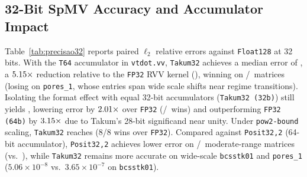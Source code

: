 \documentclass[conference]{IEEEtran}
\begin{document}
\subsection{32-Bit SpMV Accuracy and Accumulator Impact}
Table~\ref{tab:precisao32} reports paired $\ell_2$ relative errors against \texttt{Float128} at 32 bits. With the \texttt{T64} accumulator in \texttt{vtdot.vv}, \texttt{Takum32} achieves a median error of \MedTakumTrinta, a $5.15\times$ reduction relative to the \texttt{FP32} RVV kernel (\MedFPtrinta), winning on \ParTrintaFPTakumVence/\ParTrintaFPAmbos\ matrices (losing on \texttt{pores\_1}, whose entries span wide scale shifts near regime transitions). Isolating the format effect with equal 32-bit accumulators (\texttt{Takum32 (32b)}) still yields \MedTakumTrintaAcTrinta, lowering error by $2.01\times$ over \texttt{FP32} (\ParTrintaAcFPTakumVence/\ParTrintaAcFPAmbos\ wins) and outperforming \texttt{FP32 (64b)} by $3.15\times$ due to Takum's 28-bit significand near unity. Under \texttt{pow2-bound} scaling, \texttt{Takum32} reaches \MedTakumTrintaScaled (8/8 wins over \texttt{FP32}). Compared against \texttt{Posit32,2} (64-bit accumulator), \texttt{Posit32,2} achieves lower error on \ParTrintaPositOutroVence/\ParTrintaPositAmbos\ moderate-range matrices (\MedPositTrinta vs.\ \MedTakumTrinta), while \texttt{Takum32} remains more accurate on wide-scale \texttt{bcsstk01} and \texttt{pores\_1} ($5.06\times 10^{-8}$ vs.\ $3.65\times 10^{-7}$ on \texttt{bcsstk01}).
\end{document}
